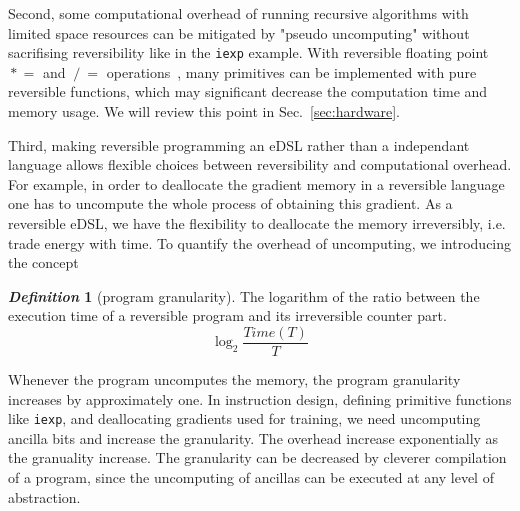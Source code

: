 \documentclass[aps,twocolumn,longbibliography,english,superscriptaddress]{revtex4-1}
\newcommand{\<}{\langle}
\renewcommand{\>}{\rangle}
\newcommand{\Sec}[1]{Sec.~\ref{#1}}
\theoremstyle{definition}\newtheorem{definition}{\textit{Definition}}
\begin{document}
Second, some computational overhead of running recursive algorithms with limited space resources can be mitigated by "pseudo uncomputing" without sacrifising reversibility like in the \texttt{iexp} example. With reversible floating point $\mathrel{*}=$ and $\mathrel{/}=$ operations~\cite{Hner2018}, many primitives can be implemented with pure reversible functions, which may significant decrease the computation time and memory usage. We will review this point in \Sec{sec:hardware}.

Third, making reversible programming an eDSL rather than a independant language allows flexible choices between reversibility and computational overhead. For example, in order to deallocate the gradient memory in a reversible language one has to uncompute the whole process of obtaining this gradient.
As a reversible eDSL, we have the flexibility to deallocate the memory irreversibly, i.e. trade energy with time. To quantify the overhead of uncomputing, we introducing the concept
\begin{definition}[program granularity]
    The logarithm of the ratio between the execution time of a reversible program and its irreversible counter part.
    \begin{equation}
        \log_2 \frac{Time(T)}{T}
    \end{equation}
\end{definition}
Whenever the program uncomputes the memory, the program granularity increases by approximately one. In instruction design, defining primitive functions like \texttt{iexp}, and deallocating gradients used for training, we need uncomputing ancilla bits and increase the granularity. The overhead increase exponentially as the granuality increase.
The granularity can be decreased by cleverer compilation of a program, since the uncomputing of ancillas can be executed at any level of abstraction.

\end{document}
